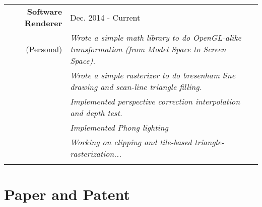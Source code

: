 \documentclass[a4paper,10pt]{article} %
\begin{document}
\begin{tabular}{rp{12.0cm}}
\textbf{Software Renderer} & Dec. 2014 - Current \\
\footnotesize{(Personal)} & \footnotesize{\emph{ Wrote a simple math library to do OpenGL-alike transformation (from Model Space to Screen Space).}}\\
& \footnotesize{\emph{ Wrote a simple rasterizer to do bresenham line drawing and scan-line triangle filling.}}\\
& \footnotesize{\emph{ Implemented perspective correction interpolation and depth test.}}\\
& \footnotesize{\emph{ Implemented Phong lighting }}\\
& \footnotesize{\emph{ Working on clipping and tile-based triangle-rasterization...}}\\
\multicolumn{2}{c}{} \\

\end{tabular}




\section{Paper and Patent}
\end{document}
